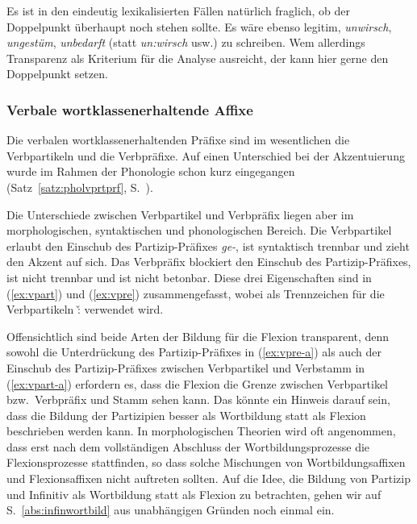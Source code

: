 Es ist in den eindeutig lexikalisierten Fällen natürlich fraglich, ob der Doppelpunkt überhaupt noch stehen sollte.
Es wäre ebenso legitim, \textit{unwirsch}, \textit{ungestüm}, \textit{unbedarft} (statt \textit{un:wirsch} usw.) zu schreiben.
Wem allerdings Transparenz als Kriterium für die Analyse ausreicht, der kann hier gerne den Doppelpunkt setzen.

\subsubsection{Verbale wortklassenerhaltende Affixe}

\label{sec:wkleaffixe}

Die verbalen wortklassenerhaltenden Präfixe sind im wesentlichen die Verbpartikeln und die Verbpräfixe.
Auf einen Unterschied bei der Akzentuierung wurde im Rahmen der Phonologie schon kurz eingegangen (Satz~\ref{satz:pholvprtprf}, S.~\pageref{satz:pholvprtprf}).

Die Unterschiede zwischen Verbpartikel und Verbpräfix liegen aber im morphologischen, syntaktischen und phonologischen Bereich.
Die Verbpartikel erlaubt den Einschub des Partizip-Präfixes \textit{ge-}, ist syntaktisch trennbar und zieht den Akzent auf sich.
Das Verbpräfix blockiert den Einschub des Partizip-Präfixes, ist nicht trennbar und ist nicht betonbar.
Diese drei Eigenschaften sind in (\ref{ex:vpart}) und (\ref{ex:vpre}) zusammengefasst, wobei als Trennzeichen für die Verbpartikeln \v: verwendet wird.

\begin{exe}
\end{exe}

\label{abs:praefixundflex}Offensichtlich sind beide Arten der Bildung für die Flexion transparent, denn sowohl die Unterdrückung des Partizip-Präfixes in (\ref{ex:vpre-a}) als auch der Einschub des Partizip-Präfixes zwischen Verbpartikel und Verbstamm in (\ref{ex:vpart-a}) erfordern es, dass die Flexion die Grenze zwischen Verbpartikel bzw.\ Verbpräfix und Stamm sehen kann.
Das könnte ein Hinweis darauf sein, dass die Bildung der Partizipien besser als Wortbildung statt als Flexion beschrieben werden kann.
In morphologischen Theorien wird oft angenommen, dass erst nach dem vollständigen Abschluss der Wortbildungsprozesse die Flexionsprozesse stattfinden, so dass solche Mischungen von Wortbildungsaffixen und Flexionsaffixen nicht auftreten sollten.
Auf die Idee, die Bildung von Partizip und Infinitiv als Wortbildung statt als Flexion zu betrachten, gehen wir auf S.\ \ref{abs:infinwortbild} aus unabhängigen Gründen noch einmal ein.

